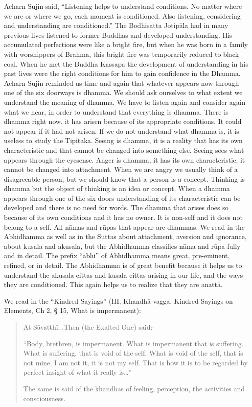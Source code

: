 Acharn Sujin said, ``Listening helps to understand conditions. No matter where we are or where we go, each moment is conditioned. Also listening, considering and understanding are conditioned.'' The Bodhisatta Jotipāla had in many previous lives listened to former Buddhas and developed understanding. His accumulated perfections were like a bright fire, but when he was born in a family with worshippers of Brahma, this bright fire was temporarily reduced to black coal. When he met the Buddha Kassapa the development of understanding in his past lives were the right conditions for him to gain confidence in the Dhamma. Acharn Sujin reminded us time and again that whatever appears now through one of the six doorways is dhamma. We should ask ourselves to what extent we understand the meaning of dhamma. We have to listen again and consider again what we hear, in order to understand that everything is dhamma. There is dhamma right now, it has arisen because of its appropriate conditions. It could not appear if it had not arisen. If we do not understand what dhamma is, it is useless to study the Tipiṭaka. Seeing is dhamma, it is a reality that has its own characteristic and that cannot be changed into something else. Seeing sees what appears through the eyesense. Anger is dhamma, it has its own characteristic, it cannot be changed into attachment. When we are angry we usually think of a disagreeable person, but we should know that a person is a concept. Thinking is dhamma but the object of thinking is an idea or concept. When a dhamma appears through one of the six doors understanding of its characteristic can be developed and there is no need for words. The dhamma that arises does so because of its own conditions and it has no owner. It is non-self and it does not belong to a self.
All nāmas and rūpas that appear are dhammas. We read in the Abhidhamma as well as in the Suttas about attachment, aversion and ignorance, about kusala and akusala, but the Abhidhamma classifies nāma and rūpa fully and in detail. The prefix ``abhi'' of Abhidhamma means great, pre-eminent, refined, or in detail. The Abhidhamma is of great benefit because it helps us to understand the akusala cittas and kusala cittas arising in our life, and the ways they are conditioned. This again helps us to realize that they are anattā.

We read in the ``Kindred Sayings'' (III, Khandhā-vagga, Kindred Sayings on Elements, Ch 2, § 15, What is impermanent):

\begin{quote}
At Sāvatthī...Then (the Exalted One) said:-

``Body, brethren, is impermanent. What is impermanent that is suffering. What is suffering, that is void of the self. What is void of the self, that is not mine, I am not it, it is not my self. That is how it is to be regarded by perfect insight of what it really is\ldots''

The same is said of the khandhas of feeling, perception, the activities and consciousness.
\end{quote}

